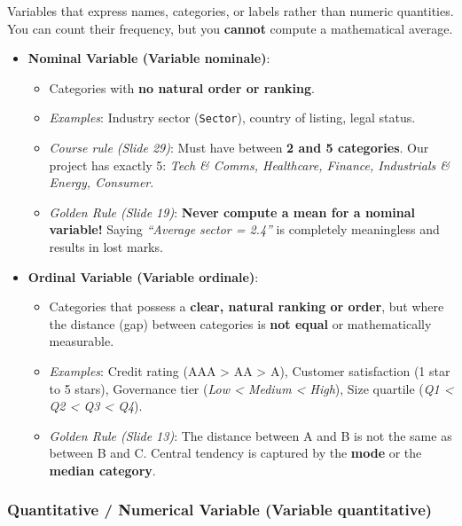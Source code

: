 \documentclass[
]{article}
\providecommand{\tightlist}{%
  \setlength{\itemsep}{0pt}\setlength{\parskip}{0pt}}
\begin{document}
Variables that express names, categories, or labels rather than numeric
quantities. You can count their frequency, but you \textbf{cannot}
compute a mathematical average.

\begin{itemize}
\tightlist
\item
  \textbf{Nominal Variable (Variable nominale)}:

  \begin{itemize}
  \tightlist
  \item
    Categories with \textbf{no natural order or ranking}.
  \item
    \emph{Examples}: Industry sector (\texttt{Sector}), country of
    listing, legal status.
  \item
    \emph{Course rule (Slide 29)}: Must have between \textbf{2 and 5
    categories}. Our project has exactly 5: \emph{Tech \& Comms,
    Healthcare, Finance, Industrials \& Energy, Consumer}.
  \item
    \emph{Golden Rule (Slide 19)}: \textbf{Never compute a mean for a
    nominal variable!} Saying \emph{``Average sector = 2.4''} is
    completely meaningless and results in lost marks.
  \end{itemize}
\item
  \textbf{Ordinal Variable (Variable ordinale)}:

  \begin{itemize}
  \tightlist
  \item
    Categories that possess a \textbf{clear, natural ranking or order},
    but where the distance (gap) between categories is \textbf{not
    equal} or mathematically measurable.
  \item
    \emph{Examples}: Credit rating (AAA \textgreater{} AA \textgreater{}
    A), Customer satisfaction (1 star to 5 stars), Governance tier
    (\emph{Low \textless{} Medium \textless{} High}), Size quartile
    (\emph{Q1 \textless{} Q2 \textless{} Q3 \textless{} Q4}).
  \item
    \emph{Golden Rule (Slide 13)}: The distance between A and B is not
    the same as between B and C. Central tendency is captured by the
    \textbf{mode} or the \textbf{median category}.
  \end{itemize}
\end{itemize}

\subsubsection{Quantitative / Numerical Variable (Variable
quantitative)}\label{quantitative-numerical-variable-variable-quantitative}
\end{document}
